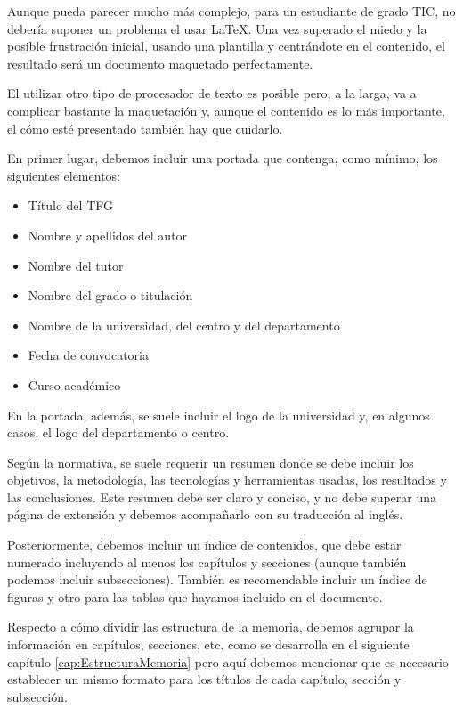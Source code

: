 Aunque pueda parecer mucho más complejo, para un estudiante de grado TIC, no debería suponer un problema el usar \LaTeX. Una vez superado el miedo y la posible frustración inicial, usando una plantilla y centrándote en el contenido, el resultado será un documento maquetado perfectamente.

El utilizar otro tipo de procesador de texto es posible pero, a la larga, va a complicar bastante la maquetación y, aunque el contenido es lo más importante, el cómo esté presentado también hay que cuidarlo.

En primer lugar, debemos incluir una portada que contenga, como mínimo, los siguientes elementos:
\begin{itemize}
    \item Título del TFG
    \item Nombre y apellidos del autor
    \item Nombre del tutor
    \item Nombre del grado o titulación
    \item Nombre de la universidad, del centro y del departamento
    \item Fecha de convocatoria
    \item Curso académico
\end{itemize}

En la portada, además, se suele incluir el logo de la universidad y, en algunos casos, el logo del departamento o centro.


Según la normativa, se suele requerir un resumen donde se debe incluir los objetivos, la metodología, las tecnologías y herramientas usadas, los resultados y las conclusiones. Este resumen debe ser claro y conciso, y no debe superar una página de extensión y debemos acompañarlo con su traducción al inglés.

Posteriormente, debemos incluir un índice de contenidos, que debe estar numerado incluyendo al menos los capítulos y secciones (aunque también podemos incluir subsecciones). También es recomendable incluir un índice de figuras y otro para las tablas que hayamos incluido en el documento.

Respecto a cómo dividir las estructura de la memoria, debemos agrupar la información en capítulos, secciones, etc. como se desarrolla en el siguiente capítulo \ref{cap:EstructuraMemoria} pero aquí debemos mencionar que es necesario establecer un mismo formato para los títulos de cada capítulo, sección y subsección.

